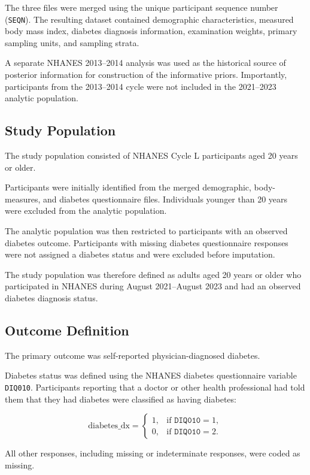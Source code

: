 \documentclass[12pt]{article}
\begin{document}
The three files were merged using the unique participant sequence number (\texttt{SEQN}). The resulting dataset contained demographic characteristics, measured body mass index, diabetes diagnosis information, examination weights, primary sampling units, and sampling strata.

A separate NHANES 2013--2014 analysis was used as the historical source of posterior information for construction of the informative priors. Importantly, participants from the 2013--2014 cycle were not included in the 2021--2023 analytic population.

\subsection{Study Population}

The study population consisted of NHANES Cycle L participants aged 20 years or older.

Participants were initially identified from the merged demographic, body-measures, and diabetes questionnaire files. Individuals younger than 20 years were excluded from the analytic population.

The analytic population was then restricted to participants with an observed diabetes outcome. Participants with missing diabetes questionnaire responses were not assigned a diabetes status and were excluded before imputation.

The study population was therefore defined as adults aged 20 years or older who participated in NHANES during August 2021--August 2023 and had an observed diabetes diagnosis status.

\subsection{Outcome Definition}

The primary outcome was self-reported physician-diagnosed diabetes.

Diabetes status was defined using the NHANES diabetes questionnaire variable \texttt{DIQ010}. Participants reporting that a doctor or other health professional had told them that they had diabetes were classified as having diabetes:

\[
\text{diabetes\_dx} =
\begin{cases}
1, & \text{if } \texttt{DIQ010}=1,\\
0, & \text{if } \texttt{DIQ010}=2.
\end{cases}
\]

All other responses, including missing or indeterminate responses, were coded as missing.
\end{document}
